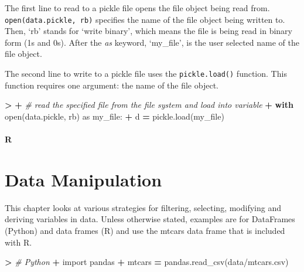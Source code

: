 \documentclass[
]{book}
\newenvironment{Shaded}{\begin{snugshade}}{\end{snugshade}}
\newcommand{\BuiltInTok}[1]{#1}
\newcommand{\CommentTok}[1]{\textcolor[rgb]{0.56,0.35,0.01}{\textit{#1}}}
\newcommand{\ControlFlowTok}[1]{\textcolor[rgb]{0.13,0.29,0.53}{\textbf{#1}}}
\newcommand{\ImportTok}[1]{#1}
\newcommand{\NormalTok}[1]{#1}
\newcommand{\OperatorTok}[1]{\textcolor[rgb]{0.81,0.36,0.00}{\textbf{#1}}}
\newcommand{\StringTok}[1]{\textcolor[rgb]{0.31,0.60,0.02}{#1}}
\begin{document}
The first line to read to a pickle file opens the file object being read from. \texttt{open(\textquotesingle{}data.pickle\textquotesingle{},\ \textquotesingle{}rb\textquotesingle{})} specifies the name of the file object being written to. Then, `rb' stands for `write binary', which means the file is being read in binary form (1s and 0s). After the \emph{as} keyword, `my\_file', is the user selected name of the file object.

The second line to write to a pickle file uses the \texttt{pickle.load()} function. This function requires one argument: the name of the file object.

\begin{Shaded}
\begin{Highlighting}[]
\OperatorTok{\textgreater{}} 
\OperatorTok{+} \CommentTok{\# read the specified file from the file system and load into variable}
\OperatorTok{+} \ControlFlowTok{with} \BuiltInTok{open}\NormalTok{(}\StringTok{\textquotesingle{}data.pickle\textquotesingle{}}\NormalTok{, }\StringTok{\textquotesingle{}rb\textquotesingle{}}\NormalTok{) }\ImportTok{as}\NormalTok{ my\_file:}
\OperatorTok{+}\NormalTok{     d }\OperatorTok{=}\NormalTok{ pickle.load(my\_file)}
\end{Highlighting}
\end{Shaded}

\hypertarget{r-16}{%
\subsubsection*{R}\label{r-16}}

\hypertarget{data-manipulation}{%
\chapter{Data Manipulation}\label{data-manipulation}}

This chapter looks at various strategies for filtering, selecting, modifying and deriving variables in data. Unless otherwise stated, examples are for DataFrames (Python) and data frames (R) and use the mtcars data frame that is included with R.

\begin{Shaded}
\begin{Highlighting}[]
\OperatorTok{\textgreater{}} \CommentTok{\# Python}
\OperatorTok{+} \ImportTok{import}\NormalTok{ pandas}
\OperatorTok{+}\NormalTok{ mtcars }\OperatorTok{=}\NormalTok{ pandas.read\_csv(}\StringTok{\textquotesingle{}data/mtcars.csv\textquotesingle{}}\NormalTok{)}
\end{Highlighting}
\end{Shaded}
\end{document}
